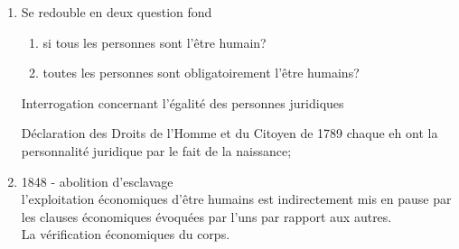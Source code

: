 \documentclass[a4paper]{report}
\begin{document}
\begin{enumerate}
    \item Se redouble en deux question fond
        \begin{enumerate}
            \item si tous les personnes sont l'être humain?
            \item toutes les personnes sont obligatoirement l'être humains?
        \end{enumerate}
        Interrogation concernant l'égalité des personnes juridiques

        Déclaration des Droits de l'Homme et du Citoyen de 1789 chaque eh ont la
        personnalité juridique par le fait de la naissance;
    \item 1848 - abolition d'esclavage \\
        l'exploitation économiques d'être humains est indirectement mis en
        pause par les clauses économiques évoquées par l'uns par rapport aux
        autres. \\
        La vérification économiques du corps.
\end{enumerate}


\end{document}
